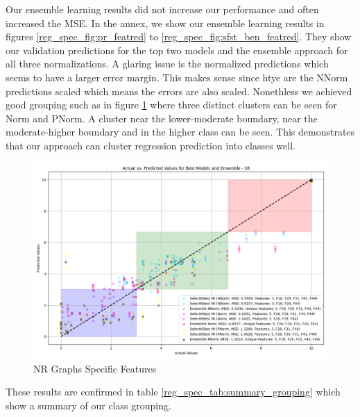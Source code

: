 \documentclass[12pt,letterpaper]{article}
\begin{document}
Our ensemble learning results did not increase our performance and often increased the MSE.
In the annex, we show our ensemble learning results in figures  \ref{reg_spec_fig:pr_featred} to \ref{reg_spec_fig:sfst_ben_featred}.
They show our validation predictions for the top two models and the ensemble approach for all three normalizations.
A glaring issue is the normalized predictions which seems to have a larger error margin.
This makes sense since htye are the NNorm predictions scaled which means the errors are also scaled.
Nonethless we achieved good grouping such as in figure \ref{reg_spec_fig:nr_featred_big} where three distinct clusters can be seen for Norm and PNorm.
A cluster near the lower-moderate boundary, near the moderate-higher boundary and in the higher class can be seen.
This demonstrates that our approach can cluster regression prediction into classes well.

\begin{figure}
    \centering
    \includegraphics[width=1\linewidth]{reg_section_specific/featred_ensemble_learning/actual_vs_predicted_best_feature_selection_and_ensemble_SR_10.png}
    \caption{NR Graphs Specific Features}
    \label{reg_spec_fig:nr_featred_big}
\end{figure}


These results are confirmed in table \ref{reg_spec_tab:summary_grouping} which show a summary of our class grouping.
\end{document}
